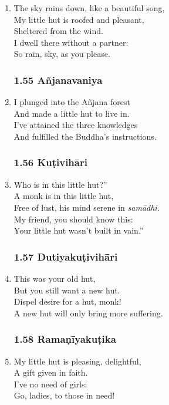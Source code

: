 \documentclass[10pt, openany]{book}
\newcommand*{\vleftofline}[1]{\leavevmode\llap{#1}}
\begin{document}
\begin{enumerate}
\item The sky rains down, like a beautiful song,\\
My little hut is roofed and pleasant, \\
Sheltered from the wind.\\
I dwell there without a partner:\\
So rain, sky, as you please.

\subsubsection*{1.55 Añjanavaniya}

\item I plunged into the  Añjana forest\\
And made a little hut to live in.\\
I’ve attained the three knowledges\\
And fulfilled the Buddha’s instructions.

\subsubsection*{1.56 Kuṭivihāri}

\item \vleftofline{“}Who is in this little hut?”\\
\vleftofline{“}A monk is in this little hut,\\
Free of lust, his mind serene in \emph{samādhi}.\\
My friend, you should know this:\\
Your little hut wasn’t built in vain.”

\subsubsection*{1.57 Dutiyakuṭivihāri}

\item This was your old hut,\\
But you still want a new hut.\\
Dispel desire for a hut, monk!\\
A new hut will only bring more suffering.

\subsubsection*{1.58 Ramaṇīyakuṭika}

\item My little hut is pleasing, delightful,\\
A gift given in faith.\\
I’ve no need of girls:\\
Go, ladies, to those in need!


\end{enumerate}
\end{document}
